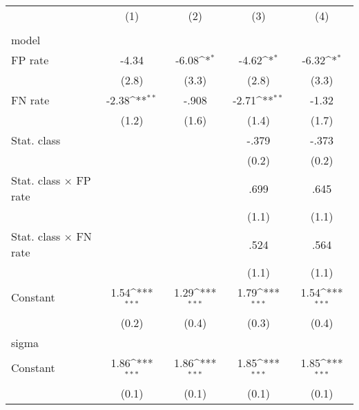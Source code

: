{
\def\sym#1{\ifmmode^{#1}\else\(^{#1}\)\fi}
\begin{tabular}{l*{4}{c}}
\hline\hline
                &\multicolumn{1}{c}{(1)}&\multicolumn{1}{c}{(2)}&\multicolumn{1}{c}{(3)}&\multicolumn{1}{c}{(4)}\\
                &\multicolumn{1}{c}{}&\multicolumn{1}{c}{}&\multicolumn{1}{c}{}&\multicolumn{1}{c}{}\\
\hline
model           &                  &                  &                  &                  \\
FP rate         &    -4.34         &    -6.08\sym{*}  &    -4.62\sym{*}  &    -6.32\sym{*}  \\
                &    (2.8)         &    (3.3)         &    (2.8)         &    (3.3)         \\
FN rate         &    -2.38\sym{**} &    -.908         &    -2.71\sym{**} &    -1.32         \\
                &    (1.2)         &    (1.6)         &    (1.4)         &    (1.7)         \\
Stat. class     &                  &                  &    -.379         &    -.373         \\
                &                  &                  &    (0.2)         &    (0.2)         \\
Stat. class $\times$ FP rate&                  &                  &     .699         &     .645         \\
                &                  &                  &    (1.1)         &    (1.1)         \\
Stat. class $\times$ FN rate&                  &                  &     .524         &     .564         \\
                &                  &                  &    (1.1)         &    (1.1)         \\
Constant        &     1.54\sym{***}&     1.29\sym{***}&     1.79\sym{***}&     1.54\sym{***}\\
                &    (0.2)         &    (0.4)         &    (0.3)         &    (0.4)         \\
\hline
sigma           &                  &                  &                  &                  \\
Constant        &     1.86\sym{***}&     1.86\sym{***}&     1.85\sym{***}&     1.85\sym{***}\\
                &    (0.1)         &    (0.1)         &    (0.1)         &    (0.1)         \\

\end{tabular}}
